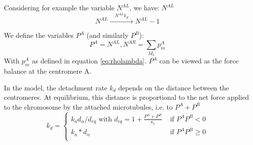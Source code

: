 \documentclass[a4paper,12pt]{article}
\begin{document}
Considering for example the variable $N^{AL}$, we have: $N^{AL} $  
\begin{equation}
    N^{AL} \xrightarrow{\quad N^{AL}k_d \quad} N^{AL}- 1%
\end{equation}

We define the variables $P^A$ (and similarly $P^B$):
\begin{equation}
  \label{eq:PA}
  P^A = N^{AL}, N^{AR} = \sum_{M_k} p_m^A
\end{equation}
With $p_m^A$ as defined in equation \ref{eq:rholambda}. $P^A$ can be
viewed as the force balance at the centromere A. 


In the model, the detachment rate $k_d$ depends on the distance
between the centromeres. At equilibrium, this distance is proportional
to the net force applied to the chromosome by the attached
microtubules, i.e. to   $P^A  + P^B$  
\begin{equation}
  \label{eq:def_kf_markov}
  k_d =%
  \begin{cases}
    k_a d_{\alpha} / d_{eq}  \mbox{ with } d_{eq} = 1 + \frac{P^A  +%
      P^B}{\kappa_c} & \mbox{ if } P^AP^B < 0 \\
    k_a * d_{\alpha} &  \mbox{ if }  P^AP^B \geq 0\\
  \end{cases}
\end{equation}






 

 

 

 

 

 
\end{document}
